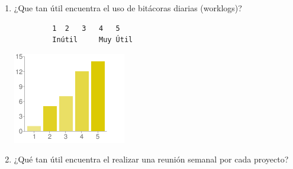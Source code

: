 \begin{enumerate}
	\item ¿Que tan útil encuentra el uso de bitácoras
		diarias (worklogs)?

		\begin{verbatim}
         1	2	3	4	5
         Inútil		Muy Útil
		\end{verbatim}
        \begin{center}
        \includegraphics[scale=0.7]{images/encuesta2/16}
        \end{center}
	\item ¿Qué tan útil encuentra el realizar una reunión
		semanal por cada proyecto?


\end{enumerate}
